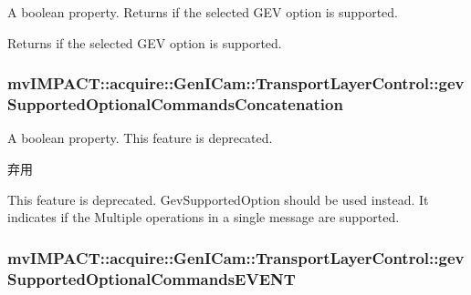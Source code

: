 A boolean property. Returns if the selected G\+E\+V option is supported. 

Returns if the selected G\+E\+V option is supported. \hypertarget{classmv_i_m_p_a_c_t_1_1acquire_1_1_gen_i_cam_1_1_transport_layer_control_ac6db9549161cbc471f29b47115bb0126}{
\subsubsection[{gev\+Supported\+Optional\+Commands\+Concatenation}]{ mv\+I\+M\+P\+A\+C\+T\+::acquire\+::\+Gen\+I\+Cam\+::\+Transport\+Layer\+Control\+::gev\+Supported\+Optional\+Commands\+Concatenation}}\label{classmv_i_m_p_a_c_t_1_1acquire_1_1_gen_i_cam_1_1_transport_layer_control_ac6db9549161cbc471f29b47115bb0126}


A boolean property. This feature is deprecated. 

\begin{DoxyRefDesc}{弃用}
\item[\hyperlink{deprecated__deprecated000076}{弃用}]This feature is deprecated. Gev\+Supported\+Option should be used instead. It indicates if the Multiple operations in a single message are supported. \end{DoxyRefDesc}
\hypertarget{classmv_i_m_p_a_c_t_1_1acquire_1_1_gen_i_cam_1_1_transport_layer_control_a76ed5e2120488e583cec4b9bbe4a5cdc}{
\subsubsection[{gev\+Supported\+Optional\+Commands\+E\+V\+E\+N\+T}]{ mv\+I\+M\+P\+A\+C\+T\+::acquire\+::\+Gen\+I\+Cam\+::\+Transport\+Layer\+Control\+::gev\+Supported\+Optional\+Commands\+E\+V\+E\+N\+T}}\label{classmv_i_m_p_a_c_t_1_1acquire_1_1_gen_i_cam_1_1_transport_layer_control_a76ed5e2120488e583cec4b9bbe4a5cdc}


